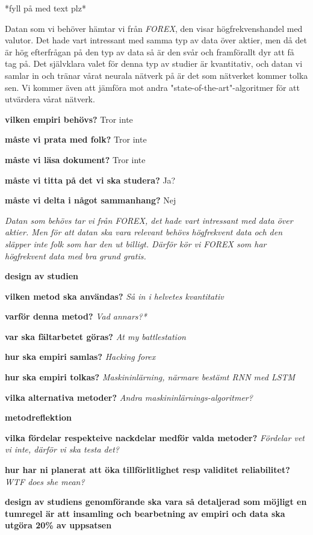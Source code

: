 *fyll på med text plz*

Datan som vi behöver hämtar vi från \textit{FOREX}, den visar högfrekvenshandel med valutor. Det hade vart intressant med samma typ av data över aktier, men då det är hög efterfrågan på den typ av data så är den svår och framförallt dyr att få tag på.
Det självklara valet för denna typ av studier är kvantitativ, och datan vi samlar in och tränar vårat neurala nätverk på är det som nätverket kommer tolka sen. Vi kommer även att jämföra mot andra "state-of-the-art"-algoritmer för att utvärdera vårat nätverk.

\textbf{vilken empiri behövs?} Tror inte

\textbf{måste vi prata med folk?} Tror inte

\textbf{måste vi läsa dokument?} Tror inte

\textbf{måste vi titta på det vi ska studera?} Ja?

\textbf{måste vi delta i något sammanhang?} Nej

\textit{Datan som behövs tar vi från FOREX, det hade vart intressant med data över aktier. Men för att datan ska vara relevant behövs högfrekvent data och den släpper inte folk som har den ut billigt. Därför kör vi FOREX som har högfrekvent data med bra grund gratis.}

\textbf{design av studien}

\textbf{vilken metod ska användas?}
\textit{Så in i helvetes kvantitativ}

\textbf{varför denna metod?}
\textit{Vad annars?*}

\textbf{var ska fältarbetet göras?}
\textit{At my battlestation}

\textbf{hur ska empiri samlas?}
\textit{Hacking forex}

\textbf{hur ska empiri tolkas?}
\textit{Maskininlärning, närmare bestämt RNN med LSTM}

\textbf{vilka alternativa metoder?}
\textit{Andra maskininlärnings-algoritmer?}

\textbf{metodreflektion}

\textbf{vilka fördelar respekteive nackdelar medför valda metoder?}
\textit{Fördelar vet vi inte, därför vi ska testa det?}

\textbf{hur har ni planerat att öka tillförlitlighet resp validitet reliabilitet?}
\textit{WTF does she mean?}

\textbf{design av studiens genomförande ska vara så detaljerad som möjligt en tumregel är att insamling och bearbetning av empiri och data ska utgöra 20\% av uppsatsen}
